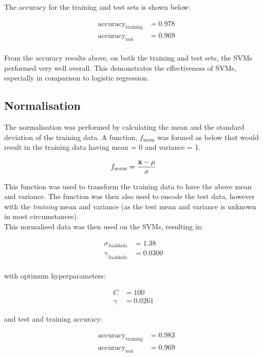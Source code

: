 \documentclass{scrartcl}
\begin{document}
The accuracy for the training and test sets is shown below:

\begin{align*}
    & \text{accuracy}_{\text{training}}   &= 0.978 \\
    & \text{accuracy}_{\text{test}}       &= 0.969 \\
\end{align*}

From the accuracy results above, on both the training and test sets, the SVMs performed very well overall. This demonstrates the effectiveness of SVMs, especially in comparison to logistic regression.

\subsection{Normalisation}

The normalisation was performed by calculating the mean and the standard deviation of the training data. A function, $f_{\text{norm}}$ was formed as below that would result in the training data having mean = 0 and variance = 1.

\[ f_{\text{norm}} = \frac {{\mathbf x} - \mu} {\sigma} \]

This function was used to transform the training data to have the above mean and variance. The function was then also used to encode the test data, however with the \emph{training} mean and variance (as the test mean and variance is unknown in most circumstances). \\

This normalised data was then used on the SVMs, resulting in:

\begin{align*}
    \sigma_{\text{Jaakkola}} &= 1.38   \\
    \gamma_{\text{Jaakkola}} &= 0.0300 \\
\end{align*}

with optimum hyperparameters:

\begin{align*}
    C &= 100 \\
    \gamma &= 0.0261
\end{align*}

and test and training accuracy:

\begin{align*}
    & \text{accuracy}_{\text{training}}   &= 0.983 \\
    & \text{accuracy}_{\text{test}}       &= 0.969 \\
\end{align*}
\end{document}
